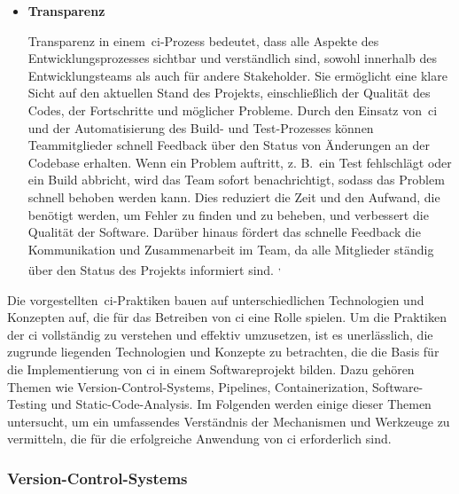 \begin{itemize}
    \item {
        \textbf{Transparenz}\par
        Transparenz in einem\ \acrshort{ci}-Prozess bedeutet, dass alle Aspekte des Entwicklungsprozesses sichtbar und
        verständlich sind, sowohl innerhalb des Entwicklungsteams als auch für andere Stakeholder.
        Sie ermöglicht eine klare Sicht auf den aktuellen Stand des Projekts, einschließlich der Qualität des Codes,
        der Fortschritte und möglicher Probleme.
        Durch den Einsatz von\ \acrshort{ci} und der Automatisierung des Build- und Test-Prozesses können Teammitglieder
        schnell Feedback über den Status von Änderungen an der Codebase erhalten.
        Wenn ein Problem auftritt, z. B.\ ein Test fehlschlägt oder ein Build abbricht, wird das Team sofort
        benachrichtigt, sodass das Problem schnell behoben werden kann.
        Dies reduziert die Zeit und den Aufwand, die benötigt werden, um Fehler zu finden und zu beheben, und verbessert
        die Qualität der Software.
        Darüber hinaus fördert das schnelle Feedback die Kommunikation und Zusammenarbeit im Team, da alle Mitglieder
        ständig über den Status des Projekts informiert sind.
        \textsuperscript{,}
    }
\end{itemize}

Die vorgestellten\ \acrshort{ci}-Praktiken bauen auf unterschiedlichen Technologien und Konzepten auf, die für das
Betreiben von \acrlong{ci} eine Rolle spielen.
Um die Praktiken der \acrlong{ci} vollständig zu verstehen und effektiv umzusetzen, ist es
unerlässlich, die zugrunde liegenden Technologien und Konzepte zu betrachten, die die Basis für die Implementierung von
\acrshort{ci} in einem Softwareprojekt bilden.
Dazu gehören Themen wie Version-Control-Systems, Pipelines, Containerization, Software-Testing und
Static-Code-Analysis.
Im Folgenden werden einige dieser Themen untersucht, um ein umfassendes Verständnis der Mechanismen und Werkzeuge zu
vermitteln, die für die erfolgreiche Anwendung von \acrlong{ci} erforderlich sind.

\subsubsection{Version-Control-Systems}

